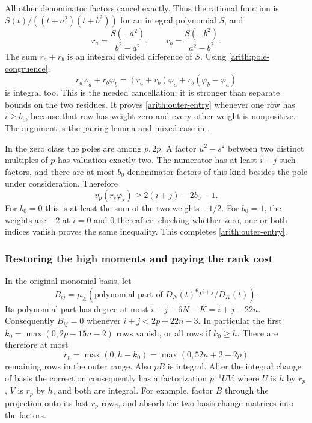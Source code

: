 All other denominator factors cancel exactly. Thus the rational
function is $S(t)/((t+a^2)(t+b^2))$ for an integral polynomial $S$,
and
\[
 r_a=\frac{S(-a^2)}{b^2-a^2},\qquad
 r_b=\frac{S(-b^2)}{a^2-b^2}.
\]
The sum $r_a+r_b$ is an integral divided difference of $S$.
Using \eqref{arith:pole-congruence},
\[
 r_a\varphi_a+r_b\varphi_b
 =(r_a+r_b)\varphi_a+r_b(\varphi_b-\varphi_a)
\]
is integral too. This is the needed cancellation; it is stronger
than separate bounds on the two residues.
It proves \eqref{arith:outer-entry} whenever one row has $i\ge b_c$,
because that row has weight zero and every other weight is nonpositive.
The argument is the pairing lemma and mixed case in
\cite[\texttt{OuterEntries.lean}, \texttt{pair\_GV};
\texttt{OuterEntryMain.lean}, \texttt{pole\_case\_b}]{firsching}.

In the zero class the poles are among $p,2p$. A factor $u^2-s^2$
between two distinct multiples of $p$ has valuation exactly two.
The numerator has at least $i+j$ such factors, and there are at most
$b_0$ denominator factors of this kind besides the pole under
consideration. Therefore
\[
 v_p(r_s\varphi_s)\ge2(i+j)-2b_0-1.
\]
For $b_0=0$ this is at least the sum of the two weights $-1/2$.
For $b_0=1$, the weights are $-2$ at $i=0$ and $0$ thereafter;
checking whether zero, one or both indices vanish proves the same
inequality. This completes \eqref{arith:outer-entry}.

\subsubsection*{Restoring the high moments and paying the rank cost}

In the original monomial basis, let
\[
 B_{ij}=\mu_{\ge}\left(
       \text{polynomial part of }D_N(t)^6t^{i+j}/D_K(t)\right).
\]
Its polynomial part has degree at most $i+j+6N-K=i+j-22n$.
Consequently $B_{ij}=0$ whenever $i+j<2p+22n-3$.
In particular the first
$k_0=\max(0,2p-15n-2)$ rows vanish, or all rows if $k_0\ge h$.
There are therefore at most
\[
 r_p=\max(0,h-k_0)=\max(0,52n+2-2p)
\]
remaining rows in the outer range.
Also $pB$ is integral. After the integral change of basis the
correction consequently has a factorization $p^{-1}UV$, where
$U$ is $h$ by $r_p$, $V$ is $r_p$ by $h$, and both are integral.
For example, factor $B$ through the projection onto its last
$r_p$ rows, and absorb the two basis-change matrices into the factors.

